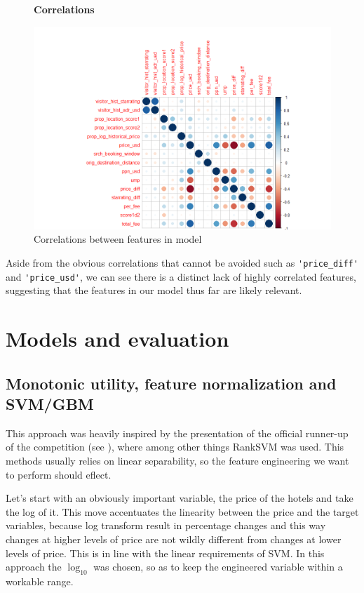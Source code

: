 \documentclass{llncs}
\begin{document}
	\begin{figure}[H]
	\centering
	\textbf{Correlations}\par\medskip
		\includegraphics[scale=0.3]{figures/corr_plot.png}
	\caption{Correlations between features in model}
	\label{fig:corr}
	\end{figure}

Aside from the obvious correlations that cannot be avoided such as \verb!'price_diff'! and \verb!'price_usd'!, we can see there is a distinct lack of highly correlated features, suggesting that the features in our model thus far are likely relevant. 


\section{Models and evaluation}


\subsection{Monotonic utility, feature normalization and SVM/GBM}
This approach was heavily inspired by the presentation of the official runner-up of the competition (see \cite{Wang2013}), where among other things RankSVM was used. This methods usually relies on linear separability, so the feature engineering we want to perform should eflect.

Let's start with an obviously important variable, the price of the hotels and take the log of it. This move accentuates the linearity between the price and the target variables, because log transform result in percentage changes and this way changes at higher levels of price are not wildly different from changes at lower levels of price. This is in line with the linear requirements of SVM. In this approach the $\log_{10}$ was chosen, so as to keep the engineered variable within a workable range.
\end{document}
